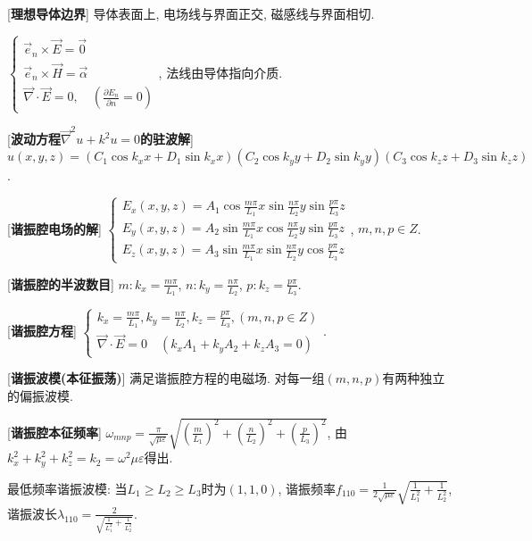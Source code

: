 [\textbf{理想导体边界}] 导体表面上, 电场线与界面正交, 磁感线与界面相切.\par
\qquad $\begin{cases}\vec e_n\times\vec E=\vec 0\\\vec e_n\times\vec H=\vec\alpha\\\vec\nabla\cdot\vec E=0, \quad(\frac{\partial E_n}{\partial n}=0)\end{cases}$, 法线由导体指向介质.\par

[\textbf{波动方程$\vec\nabla^2 u+k^2u=0$的驻波解}] \\
$u(x,y,z)=(C_1\cos{k_xx}+D_1\sin{k_xx})(C_2\cos{k_yy}+D_2\sin{k_yy})(C_3\cos{k_zz}+D_3\sin{k_zz})$.\par

[\textbf{谐振腔电场的解}] $\begin{cases}E_x(x,y,z)=A_1\cos{\frac{m\pi}{L_1}x}\sin{\frac{n\pi}{L_2}y}\sin{\frac{p\pi}{L_3}z}\\E_y(x,y,z)=A_2\sin{\frac{m\pi}{L_1}x}\cos{\frac{n\pi}{L_2}y}\sin{\frac{p\pi}{L_3}z}\\E_z(x,y,z)=A_3\sin{\frac{m\pi}{L_1}x}\sin{\frac{n\pi}{L_2}y}\cos{\frac{p\pi}{L_3}z}\end{cases}$, $m,n,p\in Z$.\par

[\textbf{谐振腔的半波数目}] $m:k_x=\frac{m\pi}{L_1}$, $n:k_y=\frac{n\pi}{L_2}$, $p:k_z=\frac{p\pi}{L_3}$.\par

[\textbf{谐振腔方程}] $\begin{cases}k_x=\frac{m\pi}{L_1}, k_y=\frac{n\pi}{L_2}, k_z=\frac{p\pi}{L_3}, (m,n,p\in Z)\\\vec\nabla\cdot\vec E=0\quad (k_xA_1+k_yA_2+k_zA_3=0)\end{cases}$.\par

[\textbf{谐振波模(本征振荡)}] 满足谐振腔方程的电磁场. 对每一组$(m,n,p)$有两种独立的偏振波模.\par

[\textbf{谐振腔本征频率}] $\omega_{mnp}=\frac{\pi}{\sqrt{\mu\varepsilon}}\sqrt{\left(\frac{m}{L_1}\right)^2+\left(\frac{n}{L_2}\right)^2+\left(\frac{p}{L_3}\right)^2}$, 由$k_x^2+k_y^2+k_z^2=k_2=\omega^2\mu\varepsilon$得出.\par
\qquad 最低频率谐振波模: 当$L_1\ge L_2\ge L_3$时为$(1,1,0)$, 谐振频率$f_{110}=\frac{1}{2\sqrt{\mu\varepsilon}}\sqrt{\frac{1}{L_1^2}+\frac{1}{L_2^2}}$, 谐振波长$\lambda_{110}=\frac{2}{\sqrt{\frac{1}{L_1^2}+\frac{1}{L_2^2}}}$.\par

